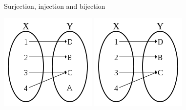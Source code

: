 \documentclass{beamer}
\begin{document}
\begin{frame}{Surjection, injection and bijection}
    \begin{center}
        \begin{minipage}{0.48\linewidth}
            \centering
            \includegraphics[width=0.5\linewidth]{fig/180px-Not-Injection-Surjection.svg.png}
            \includegraphics[width=0.49\linewidth]{fig/Surjection.svg.png}


\end{minipage}
\end{center}
\end{frame}
\end{document}
